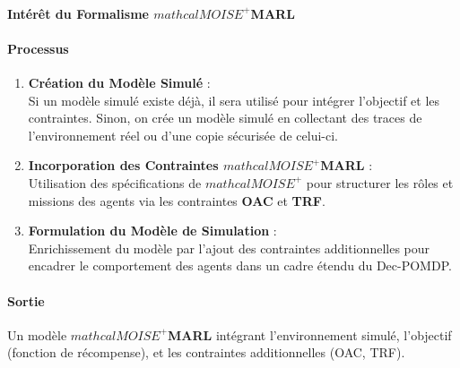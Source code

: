 \documentclass[sigconf,anonymous]{aamas}
\begin{document}
\paragraph{Intérêt du Formalisme $mathcal{M}OISE^+$MARL}





\paragraph{Processus}
\begin{enumerate}
    \item \textbf{Création du Modèle Simulé} :\\
    Si un modèle simulé existe déjà, il sera utilisé pour intégrer l'objectif et les contraintes. Sinon, on crée un modèle simulé en collectant des traces de l'environnement réel ou d'une copie sécurisée de celui-ci.
    
    \item \textbf{Incorporation des Contraintes $mathcal{M}OISE^+$MARL} :\\
    Utilisation des spécifications de \textbf{$mathcal{M}OISE^+$} pour structurer les rôles et missions des agents via les contraintes \textbf{OAC} et \textbf{TRF}.
    
    \item \textbf{Formulation du Modèle de Simulation} :\\
    Enrichissement du modèle par l'ajout des contraintes additionnelles pour encadrer le comportement des agents dans un cadre étendu du Dec-POMDP.
\end{enumerate}

\paragraph{Sortie}
Un modèle \textbf{$mathcal{M}OISE^+$MARL} intégrant l'environnement simulé, l'objectif (fonction de récompense), et les contraintes additionnelles (OAC, TRF).

\end{document}
